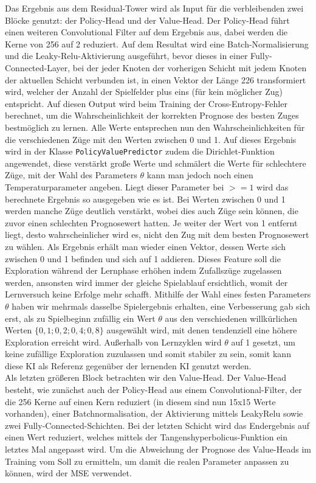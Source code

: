 \documentclass[12pt,a4paper]{article}
\begin{document}
Das Ergebnis aus dem Residual-Tower wird als Input für die verbleibenden zwei Blöcke genutzt: der Policy-Head und der Value-Head. Der Policy-Head führt einen weiteren Convolutional Filter auf dem Ergebnis aus, dabei werden die Kerne von 256 auf 2 reduziert. Auf dem Resultat  wird eine Batch-Normalisierung und die Leaky-Relu-Aktivierung ausgeführt, bevor dieses in einer Fully-Connected-Layer, bei der jeder Knoten der vorherigen Schicht mit jedem Knoten der aktuellen Schicht verbunden ist, in einen Vektor der Länge 226 transformiert wird, welcher der Anzahl der Spielfelder plus eins (für kein möglicher Zug) entspricht. Auf diesen Output wird beim Training der Cross-Entropy-Fehler berechnet, um die Wahrscheinlichkeit der korrekten Prognose des besten Zuges bestmöglich zu lernen. Alle Werte entsprechen nun den Wahrscheinlichkeiten für die verschiedenen Züge mit den Werten zwischen 0 und 1. Auf dieses Ergebnis wird in der Klasse \texttt{PolicyValuePredictor} zudem die Dirichlet-Funktion angewendet, diese verstärkt große Werte und schmälert die Werte für schlechtere Züge, mit der Wahl des Parameters $\theta$ kann man jedoch noch einen Temperaturparameter angeben. Liegt dieser Parameter bei $>= 1$ wird das berechnete Ergebnis so ausgegeben wie es ist. Bei Werten zwischen 0 und 1 werden manche Züge deutlich verstärkt, wobei dies auch Züge sein können, die zuvor einen schlechten Prognosewert hatten. Je weiter der Wert von 1 entfernt liegt, desto wahrscheinlicher wird es, nicht den Zug mit dem besten Prognosewert zu wählen. Als Ergebnis erhält man wieder einen Vektor, dessen Werte sich zwischen 0 und 1 befinden und sich auf 1 addieren. Dieses Feature soll die Exploration während der Lernphase erhöhen indem Zufallszüge zugelassen werden, ansonsten wird immer der gleiche Spielablauf ersichtlich, womit der Lernversuch keine Erfolge mehr schafft. Mithilfe der Wahl eines festen Parameters $\theta$ haben wir mehrmals dasselbe Spielergebnis erhalten, eine Verbesserung gab sich erst, als zu Spielbeginn zufällig ein Wert  $\theta$ aus den verschiedenen willkürlichen Werten $\{0,1; 0,2; 0,4; 0,8\}$ ausgewählt wird, mit denen tendenziell eine höhere Exploration erreicht wird. Außerhalb von Lernzyklen wird $\theta$ auf 1 gesetzt, um keine zufällige Exploration zuzulassen und somit stabiler zu sein, somit kann diese KI als Referenz gegenüber der lernenden KI genutzt werden. \\
Als letzten größeren Block betrachten wir den Value-Head. Der Value-Head besteht, wie zunächst auch der Policy-Head aus einem Convolutional-Filter, der die 256 Kerne auf einen Kern reduziert (in diesem sind nun 15x15 Werte vorhanden), einer Batchnormalisation, der Aktivierung mittels LeakyRelu sowie zwei Fully-Connected-Schichten. Bei der letzten Schicht wird das Endergebnis auf einen Wert reduziert, welches mittels der Tangenshyperbolicus-Funktion ein letztes Mal angepasst wird. Um die Abweichung der Prognose des Value-Heads im Training vom Soll zu ermitteln, um damit die realen Parameter anpassen zu können, wird der MSE verwendet. 
\end{document}
